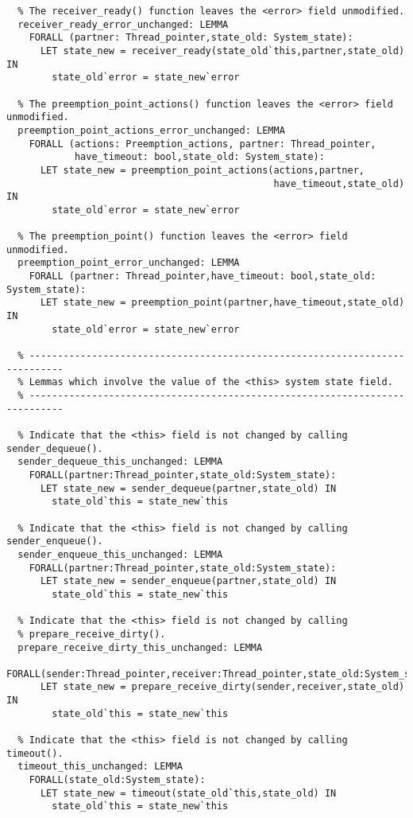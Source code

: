 \begin{lstlisting}
  % The receiver_ready() function leaves the <error> field unmodified.
  receiver_ready_error_unchanged: LEMMA 
    FORALL (partner: Thread_pointer,state_old: System_state):
      LET state_new = receiver_ready(state_old`this,partner,state_old) IN
        state_old`error = state_new`error

  % The preemption_point_actions() function leaves the <error> field unmodified.
  preemption_point_actions_error_unchanged: LEMMA
    FORALL (actions: Preemption_actions, partner: Thread_pointer, 
            have_timeout: bool,state_old: System_state):
      LET state_new = preemption_point_actions(actions,partner,
                                               have_timeout,state_old) IN
        state_old`error = state_new`error

  % The preemption_point() function leaves the <error> field unmodified.
  preemption_point_error_unchanged: LEMMA
    FORALL (partner: Thread_pointer,have_timeout: bool,state_old: System_state):
      LET state_new = preemption_point(partner,have_timeout,state_old) IN
        state_old`error = state_new`error

  % ----------------------------------------------------------------------------
  % Lemmas which involve the value of the <this> system state field.
  % ----------------------------------------------------------------------------

  % Indicate that the <this> field is not changed by calling sender_dequeue().
  sender_dequeue_this_unchanged: LEMMA
    FORALL(partner:Thread_pointer,state_old:System_state):
      LET state_new = sender_dequeue(partner,state_old) IN
        state_old`this = state_new`this

  % Indicate that the <this> field is not changed by calling sender_enqueue().
  sender_enqueue_this_unchanged: LEMMA
    FORALL(partner:Thread_pointer,state_old:System_state):
      LET state_new = sender_enqueue(partner,state_old) IN
        state_old`this = state_new`this

  % Indicate that the <this> field is not changed by calling
  % prepare_receive_dirty().
  prepare_receive_dirty_this_unchanged: LEMMA
    FORALL(sender:Thread_pointer,receiver:Thread_pointer,state_old:System_state):
      LET state_new = prepare_receive_dirty(sender,receiver,state_old) IN
        state_old`this = state_new`this

  % Indicate that the <this> field is not changed by calling timeout().
  timeout_this_unchanged: LEMMA
    FORALL(state_old:System_state):
      LET state_new = timeout(state_old`this,state_old) IN
        state_old`this = state_new`this


\end{lstlisting}
